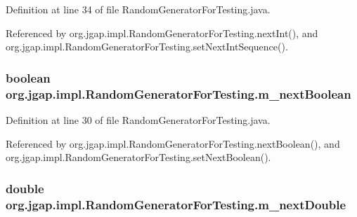 Definition at line 34 of file Random\-Generator\-For\-Testing.\-java.



Referenced by org.\-jgap.\-impl.\-Random\-Generator\-For\-Testing.\-next\-Int(), and org.\-jgap.\-impl.\-Random\-Generator\-For\-Testing.\-set\-Next\-Int\-Sequence().

\hypertarget{classorg_1_1jgap_1_1impl_1_1_random_generator_for_testing_a675749b4c353795c672a447b379a20d4}{
\subsubsection[{m\-\_\-next\-Boolean}]{\setlength{\rightskip}{0pt plus 5cm}boolean org.\-jgap.\-impl.\-Random\-Generator\-For\-Testing.\-m\-\_\-next\-Boolean\hspace{0.3cm}{\ttfamily [private]}}}\label{classorg_1_1jgap_1_1impl_1_1_random_generator_for_testing_a675749b4c353795c672a447b379a20d4}


Definition at line 30 of file Random\-Generator\-For\-Testing.\-java.



Referenced by org.\-jgap.\-impl.\-Random\-Generator\-For\-Testing.\-next\-Boolean(), and org.\-jgap.\-impl.\-Random\-Generator\-For\-Testing.\-set\-Next\-Boolean().

\hypertarget{classorg_1_1jgap_1_1impl_1_1_random_generator_for_testing_a3a0e02c60b7315af43d765a4d7f2f1c5}{
\subsubsection[{m\-\_\-next\-Double}]{\setlength{\rightskip}{0pt plus 5cm}double org.\-jgap.\-impl.\-Random\-Generator\-For\-Testing.\-m\-\_\-next\-Double\hspace{0.3cm}{\ttfamily [private]}}}\label{classorg_1_1jgap_1_1impl_1_1_random_generator_for_testing_a3a0e02c60b7315af43d765a4d7f2f1c5}


